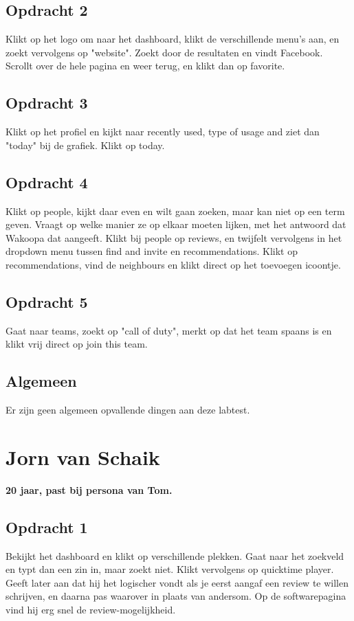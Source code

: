 \subsection{Opdracht 2}
Klikt op het logo om naar het dashboard, klikt de verschillende menu's aan, en zoekt vervolgens op "website". Zoekt door de resultaten en vindt Facebook. Scrollt over de hele pagina en weer terug, en klikt dan op favorite.

\subsection{Opdracht 3}
Klikt op het profiel en kijkt naar recently used, type of usage and ziet dan "today" bij de grafiek. Klikt op today.

\subsection{Opdracht 4}
Klikt op people, kijkt daar even en wilt gaan zoeken, maar kan niet op een term geven. Vraagt op welke manier ze op elkaar moeten lijken, met het antwoord dat Wakoopa dat aangeeft. Klikt bij people op reviews, en twijfelt vervolgens in het dropdown menu tussen find and invite en recommendations. Klikt op recommendations, vind de neighbours en klikt direct op het toevoegen icoontje.

\subsection{Opdracht 5}
Gaat naar teams, zoekt op "call of duty", merkt op dat het team spaans is en klikt vrij direct op join this team.

\subsection{Algemeen}
Er zijn geen algemeen opvallende dingen aan deze labtest.

\section{Jorn van Schaik}
\textbf{20 jaar, past bij persona van Tom.}

\subsection{Opdracht 1}
Bekijkt het dashboard en klikt op verschillende plekken. Gaat naar het zoekveld en typt dan een zin in, maar zoekt niet. Klikt vervolgens op quicktime player. Geeft later aan dat hij het logischer vondt als je eerst aangaf een review te willen schrijven, en daarna pas waarover in plaats van andersom. Op de softwarepagina vind hij erg snel de review-mogelijkheid.

